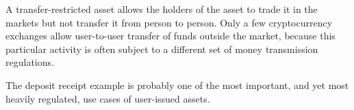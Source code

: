 A transfer-restricted asset allows the holders of the asset to trade it in the
markets but not transfer it from person to person. Only a few cryptocurrency
exchanges allow user-to-user transfer of funds outside the market, because this
particular activity is often subject to a different set of money transmission
regulations.

The deposit receipt example is probably one of the most important, and yet most
heavily regulated, use cases of user-issued assets.
